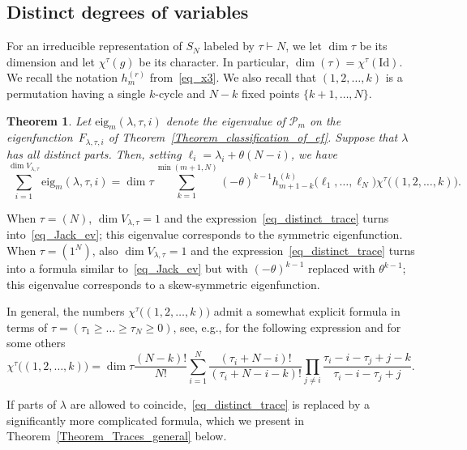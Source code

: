 \documentclass[11pt]{article}
\newtheorem{theorem}[theo]{Theorem}
\theoremstyle{definition}
\numberwithin{equation}{section}
\newcommand{\PP}{\mathcal P}
\begin{document}
\subsection{Distinct degrees of variables}

For an irreducible representation of $S_N$ labeled by $\tau\vdash N$, we let $\dim \tau$ be its dimension  and let $\chi^{\tau}(g)$ be its character. In particular, $\dim(\tau)=\chi^{\tau}(\mathrm{Id})$. We recall the notation $h_m^{(r)}$ from~\eqref{eq_x3}. We also recall that $(1,2,\dots,k)$ is a permutation having a single $k$-cycle and $N-k$ fixed points $\{k+1,\dots,N\}$.

\begin{theorem} \label{Theorem_Traces_distinct}
 Let $\mathrm{eig}_m(\lambda,\tau,i)$ denote the eigenvalue of $\PP_m$ on the eigenfunction~$F_{\lambda,\tau,i}$  of Theorem~\ref{Theorem_classification_of_ef}. Suppose that $\lambda$ has all distinct parts. Then, setting $\ell_i=\lambda_i+\theta(N-i)$, we have
 \begin{equation}
 \label{eq_distinct_trace}
  \sum_{i=1}^{\dim V_{\lambda,\tau}} \mathrm{eig}_m(\lambda,\tau,i) = \dim \tau \sum_{k=1}^{\min(m+1,N)}  (-\theta)^{k-1}  h^{(k)}_{m+1-k}\bigl(\ell_1,\dots,\ell_N\bigr) \chi^\tau\bigl( (1,2,\dots,k) ).
 \end{equation}
\end{theorem}
When $\tau=(N)$, $\dim V_{\lambda,\tau}=1$ and the expression~\eqref{eq_distinct_trace} turns into~\eqref{eq_Jack_ev}; this eigenvalue corresponds to the symmetric eigenfunction. When $\tau=(1^N)$, also $\dim V_{\lambda,\tau}=1$ and the expression~\eqref{eq_distinct_trace} turns into a formula similar to~\eqref{eq_Jack_ev} but with $(-\theta)^{k-1}$ replaced with $\theta^{k-1}$; this eigenvalue corresponds to a skew-symmetric eigenfunction.

In general, the numbers $\chi^\tau\bigl( (1,2,\dots, k) )$ admit a somewhat explicit formula in terms of $\tau=(\tau_1\ge \dots\ge\tau_N\ge 0)$, see, e.g., \cite[Example I.7.7]{macdonald1998symmetric} for the following expression and \cite[Section 3]{ivanov2002kerov} for some others
\begin{equation}
\label{eq_one_cycle_characters}
 \chi^\tau\bigl( (1,2,\dots, k) )=\dim \tau \frac{(N-k)!}{N!} \sum_{i=1}^N \frac{(\tau_i+N-i)!}{(\tau_i+N-i-k)!} \prod_{j\ne i} \frac{\tau_i-i-\tau_j+j-k}{\tau_i-i-\tau_j+j}.
\end{equation}

If parts of $\lambda$ are allowed to coincide,~\eqref{eq_distinct_trace} is replaced by a significantly more complicated formula, which we present in Theorem~\ref{Theorem_Traces_general} below.
\end{document}
